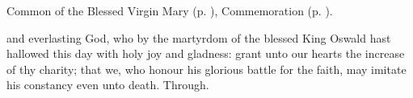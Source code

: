\begin{rubric}
	Common of the Blessed Virgin Mary (p. \pageref{CommonBVM}), Commemoration  (p. \pageref{Oswald}).
\end{rubric}


\clearpage
{}
\label{Oswald}

\memorialCollect
{} and everlasting God, who by the martyrdom of the blessed King Oswald hast hallowed this day with holy joy and gladness: grant unto our hearts the increase of thy charity; that we, who honour his glorious battle for the faith, may imitate his constancy even unto death. Through.



